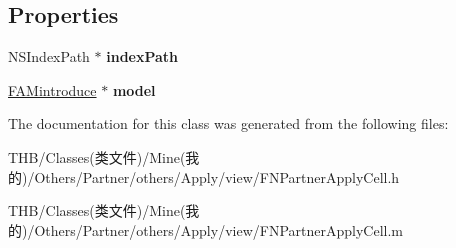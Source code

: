 \subsection*{Properties}
\begin{DoxyCompactItemize}
\item 
\mbox{\label{interface_f_n_partner_apply_cell_a59f46fb8d4162c5e8f8dc6309dcea3f4}} 
N\+S\+Index\+Path $\ast$ {\bfseries index\+Path}
\item 
\mbox{\label{interface_f_n_partner_apply_cell_acb50fdd4b2cc333ee1e6d371bed8390d}} 
\mbox{\hyperlink{interface_f_a_mintroduce}{F\+A\+Mintroduce}} $\ast$ {\bfseries model}
\end{DoxyCompactItemize}


The documentation for this class was generated from the following files\+:\begin{DoxyCompactItemize}
\item 
T\+H\+B/\+Classes(类文件)/\+Mine(我的)/\+Others/\+Partner/others/\+Apply/view/F\+N\+Partner\+Apply\+Cell.\+h\item 
T\+H\+B/\+Classes(类文件)/\+Mine(我的)/\+Others/\+Partner/others/\+Apply/view/F\+N\+Partner\+Apply\+Cell.\+m\end{DoxyCompactItemize}
